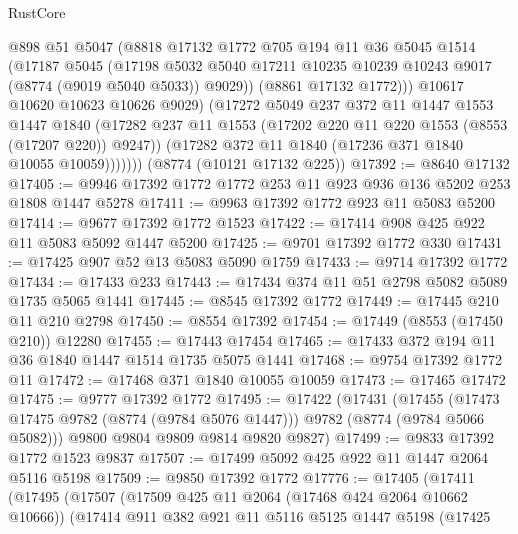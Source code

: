 \begin{lexlean}{RustCore}
\begin{coremodule}
                @898
                @51
                @5047
                (@8818
                  @17132
                  @1772
                  @705
                  @194
                  @11
                  @36
                  @5045
                  @1514
                  (@17187
                    @5045
                    (@17198
                      @5032
                      @5040
                      @17211
                      @10235
                      @10239
                      @10243
                      @9017
                      (@8774 (@9019 @5040 @5033))
                      @9029))
                  (@8861 @17132 @1772)))
              @10617
              @10620
              @10623
              @10626
              @9029)
            (@17272
              @5049
              @237
              @372
              @11
              @1447
              @1553
              @1447
              @1840
              (@17282 @237 @11 @1553 (@17202 @220 @11 @220 @1553 (@8553 (@17207 @220)) @9247))
              (@17282 @372 @11 @1840 (@17236 @371 @1840 @10055 @10059)))))))
    (@8774 (@10121 @17132 @225))
@17392 := @8640 @17132
@17405 := @9946 @17392 @1772 @1772 @253 @11 @923 @936 @136 @5202 @253 @1808 @1447 @5278
@17411 := @9963 @17392 @1772 @923 @11 @5083 @5200
@17414 := @9677 @17392 @1772 @1523
@17422 := @17414 @908 @425 @922 @11 @5083 @5092 @1447 @5200
@17425 := @9701 @17392 @1772 @330
@17431 := @17425 @907 @52 @13 @5083 @5090 @1759
@17433 := @9714 @17392 @1772
@17434 := @17433 @233
@17443 := @17434 @374 @11 @51 @2798 @5082 @5089 @1735 @5065 @1441
@17445 := @8545 @17392 @1772
@17449 := @17445 @210 @11 @210 @2798
@17450 := @8554 @17392
@17454 := @17449 (@8553 (@17450 @210)) @12280
@17455 := @17443 @17454
@17465 := @17433 @372 @194 @11 @36 @1840 @1447 @1514 @1735 @5075 @1441
@17468 := @9754 @17392 @1772 @11
@17472 := @17468 @371 @1840 @10055 @10059
@17473 := @17465 @17472
@17475 := @9777 @17392 @1772
@17495 := @17422
    (@17431
      (@17455 (@17473 @17475 @9782 (@8774 (@9784 @5076 @1447))) @9782 (@8774 (@9784 @5066 @5082)))
      @9800
      @9804
      @9809
      @9814
      @9820
      @9827)
@17499 := @9833 @17392 @1772 @1523 @9837
@17507 := @17499 @5092 @425 @922 @11 @1447 @2064 @5116 @5198
@17509 := @9850 @17392 @1772
@17776 := @17405
    (@17411
      (@17495
        (@17507
          (@17509 @425 @11 @2064 (@17468 @424 @2064 @10662 @10666))
          (@17414
            @911
            @382
            @921
            @11
            @5116
            @5125
            @1447
            @5198
            (@17425

\end{coremodule}
\end{lexlean}
